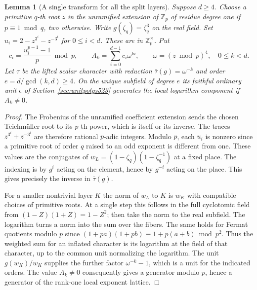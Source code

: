 \documentclass[a4paper,11pt]{article}
\newtheorem{lemma}[proposition]{Lemma}
\theoremstyle{definition}
\theoremstyle{remark}
\newcommand{\ZZ}{\mathbb Z}\newcommand{\ord}{\operatorname{ord}}
\numberwithin{equation}{section}
\begin{document}
\begin{lemma}[A single transform for all the split layers]
\leavevmode\label{lem:splittower525}
Suppose \(d\ge4\). Choose a primitive \(q\)-th root \(z\) in the
unramified extension of \(\ZZ_p\) of residue degree one if
\(p\equiv1\bmod q\), two otherwise. Write \(g(\zeta_q)=\zeta_q^3\)
on the real field. Set \(u_i=2-z^{3^i}-z^{-3^i}\) for
\(0\le i<d\). These are in \(\ZZ_p^\times\). Put
\[
 c_i=\frac{u_i^{p-1}-1}{p}\bmod p,\qquad
 A_k=\sum_{i=0}^{d-1} c_i\omega^{ki},\qquad
          \omega=(z\bmod p)^4,\quad 0\le k<d .
\]
Let \(\tau\) be the lifted scalar character with reduction
\(\bar\tau(g)=\omega^{-k}\) and order \(e=d/\gcd(k,d)\ge4\).
On the unique subfield of degree \(e\) its faithful ordinary unit
\(\epsilon\) of Section~\ref{sec:unitpolys523} generates the local
logarithm component if \(A_k\ne0\).
\end{lemma}
\begin{proof}
The Frobenius of the unramified coefficient extension sends the
chosen Teichm\"uller root to its \(p\)-th power, which is itself or
its inverse. The traces \(z^{3^i}+z^{-3^i}\) are therefore rational
\(p\)-adic integers. Modulo \(p\), each \(u_i\) is nonzero since a
primitive root of order \(q\) raised to an odd exponent is different
from one. These values are the conjugates of
\(w_L=(1-\zeta_q)(1-\zeta_q^{-1})\) at a fixed place. The indexing
is by \(g^i\) acting on the element, hence by \(g^{-i}\) acting on
the place. This gives precisely the inverse in \(\bar\tau(g)\).

For a smaller nontrivial layer \(K\) the norm of \(w_L\) to \(K\)
is \(w_K\) with compatible choices of primitive roots. At a single
step this follows in the full cyclotomic field from
\((1-Z)(1+Z)=1-Z^2\); then take the norm to the real subfield.
The logarithm turns a norm into the sum over the fibers. The same
holds for Fermat quotients modulo \(p\) since
\((1+pa)(1+pb)\equiv1+p(a+b)\bmod p^2\). Thus the weighted sum for
an inflated character is its logarithm at the field of that
character, up to the common unit normalizing the logarithm. The
unit \(g(w_K)/w_K\) supplies the further factor
\(\omega^{-k}-1\), which is a unit for the indicated orders. The
value \(A_k\ne0\) consequently gives a generator modulo \(p\), hence
a generator of the rank-one local exponent lattice.
\end{proof}
\end{document}

